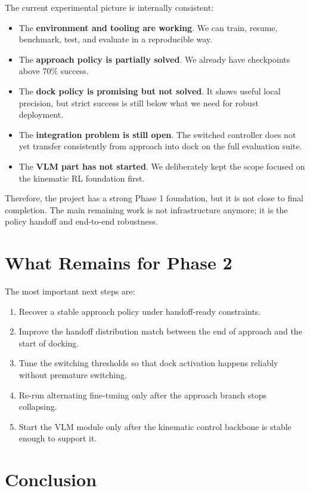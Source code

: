 \documentclass[11pt]{article}
\begin{document}
The current experimental picture is internally consistent:
\begin{itemize}[leftmargin=1.5em]
  \item The \textbf{environment and tooling are working}. We can train, resume, benchmark, test, and evaluate in a reproducible way.
  \item The \textbf{approach policy is partially solved}. We already have checkpoints above 70\% success.
  \item The \textbf{dock policy is promising but not solved}. It shows useful local precision, but strict success is still below what we need for robust deployment.
  \item The \textbf{integration problem is still open}. The switched controller does not yet transfer consistently from approach into dock on the full evaluation suite.
  \item The \textbf{VLM part has not started}. We deliberately kept the scope focused on the kinematic RL foundation first.
\end{itemize}

Therefore, the project has a strong Phase 1 foundation, but it is not close to final completion. The main remaining work is not infrastructure anymore; it is the policy handoff and end-to-end robustness.

\section{What Remains for Phase 2}

The most important next steps are:
\begin{enumerate}[leftmargin=1.5em]
  \item Recover a stable approach policy under handoff-ready constraints.
  \item Improve the handoff distribution match between the end of approach and the start of docking.
  \item Tune the switching thresholds so that dock activation happens reliably without premature switching.
  \item Re-run alternating fine-tuning only after the approach branch stops collapsing.
  \item Start the VLM module only after the kinematic control backbone is stable enough to support it.
\end{enumerate}

\section{Conclusion}
\end{document}
